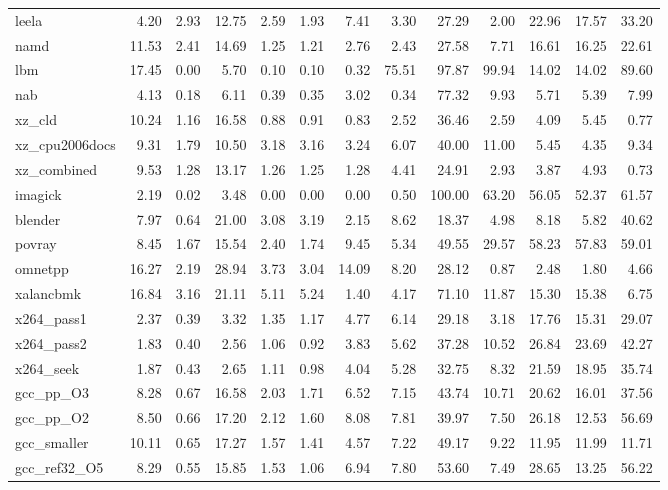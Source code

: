 \documentclass[10pt,a4paper]{article}
\begin{document}
{\begin{longtable}{@{}lrrrrrrrrrrrr@{}}
leela & 4.20 & 2.93 & 12.75 & 2.59 & 1.93 & 7.41 & 3.30 & 27.29 & 2.00 & 22.96 & 17.57 & 33.20 \\
namd & 11.53 & 2.41 & 14.69 & 1.25 & 1.21 & 2.76 & 2.43 & 27.58 & 7.71 & 16.61 & 16.25 & 22.61 \\
lbm & 17.45 & 0.00 & 5.70 & 0.10 & 0.10 & 0.32 & 75.51 & 97.87 & 99.94 & 14.02 & 14.02 & 89.60 \\
nab & 4.13 & 0.18 & 6.11 & 0.39 & 0.35 & 3.02 & 0.34 & 77.32 & 9.93 & 5.71 & 5.39 & 7.99 \\
xz\_cld & 10.24 & 1.16 & 16.58 & 0.88 & 0.91 & 0.83 & 2.52 & 36.46 & 2.59 & 4.09 & 5.45 & 0.77 \\
xz\_cpu2006docs & 9.31 & 1.79 & 10.50 & 3.18 & 3.16 & 3.24 & 6.07 & 40.00 & 11.00 & 5.45 & 4.35 & 9.34 \\
xz\_combined & 9.53 & 1.28 & 13.17 & 1.26 & 1.25 & 1.28 & 4.41 & 24.91 & 2.93 & 3.87 & 4.93 & 0.73 \\
imagick & 2.19 & 0.02 & 3.48 & 0.00 & 0.00 & 0.00 & 0.50 & 100.00 & 63.20 & 56.05 & 52.37 & 61.57 \\
blender & 7.97 & 0.64 & 21.00 & 3.08 & 3.19 & 2.15 & 8.62 & 18.37 & 4.98 & 8.18 & 5.82 & 40.62 \\
povray & 8.45 & 1.67 & 15.54 & 2.40 & 1.74 & 9.45 & 5.34 & 49.55 & 29.57 & 58.23 & 57.83 & 59.01 \\
omnetpp & 16.27 & 2.19 & 28.94 & 3.73 & 3.04 & 14.09 & 8.20 & 28.12 & 0.87 & 2.48 & 1.80 & 4.66 \\
xalancbmk & 16.84 & 3.16 & 21.11 & 5.11 & 5.24 & 1.40 & 4.17 & 71.10 & 11.87 & 15.30 & 15.38 & 6.75 \\
x264\_pass1 & 2.37 & 0.39 & 3.32 & 1.35 & 1.17 & 4.77 & 6.14 & 29.18 & 3.18 & 17.76 & 15.31 & 29.07 \\
x264\_pass2 & 1.83 & 0.40 & 2.56 & 1.06 & 0.92 & 3.83 & 5.62 & 37.28 & 10.52 & 26.84 & 23.69 & 42.27 \\
x264\_seek & 1.87 & 0.43 & 2.65 & 1.11 & 0.98 & 4.04 & 5.28 & 32.75 & 8.32 & 21.59 & 18.95 & 35.74 \\
gcc\_pp\_O3 & 8.28 & 0.67 & 16.58 & 2.03 & 1.71 & 6.52 & 7.15 & 43.74 & 10.71 & 20.62 & 16.01 & 37.56 \\
gcc\_pp\_O2 & 8.50 & 0.66 & 17.20 & 2.12 & 1.60 & 8.08 & 7.81 & 39.97 & 7.50 & 26.18 & 12.53 & 56.69 \\
gcc\_smaller & 10.11 & 0.65 & 17.27 & 1.57 & 1.41 & 4.57 & 7.22 & 49.17 & 9.22 & 11.95 & 11.99 & 11.71 \\
gcc\_ref32\_O5 & 8.29 & 0.55 & 15.85 & 1.53 & 1.06 & 6.94 & 7.80 & 53.60 & 7.49 & 28.65 & 13.25 & 56.22 \\

\end{longtable}}
\end{document}
